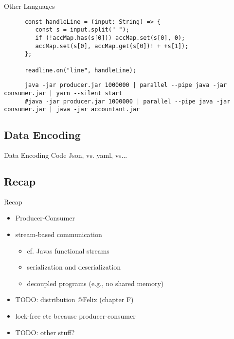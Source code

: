 {\begin{frame}[fragile]{Other Languages}
\begin{verbatim}
      const handleLine = (input: String) => {
         const s = input.split(" ");
         if (!accMap.has(s[0])) accMap.set(s[0], 0);
         accMap.set(s[0], accMap.get(s[0])! + +s[1]);
      };

      readline.on("line", handleLine);

   \end{verbatim}
   \begin{verbatim}
      java -jar producer.jar 1000000 | parallel --pipe java -jar consumer.jar | yarn --silent start
      #java -jar producer.jar 1000000 | parallel --pipe java -jar consumer.jar | java -jar accountant.jar
   \end{verbatim}
\end{frame}
\subsection{Data Encoding}
\begin{frame}{Data Encoding}
      Code Json, vs. yaml, vs...
\end{frame}
}

\subsection{Recap} %
\begin{frame}{Recap}
   \begin{itemize}[<+(1)->]
      \itemsep12pt
      \item Producer-Consumer
      \item stream-based communication \begin{itemize}
         \item cf. Javas functional streams
         \item serialization and deserialization %
         \item decoupled programs (e.g., no shared memory)
      \end{itemize}
      \item TODO: distribution @Felix (chapter F)
      \item lock-free etc because producer-consumer
      \item TODO: other stuff?
   \end{itemize}
\end{frame}

